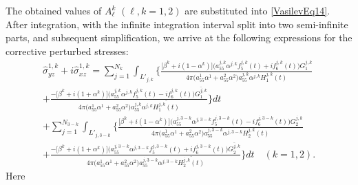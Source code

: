 The obtained values of $A_{\ell}^{k}$ $(\ell,k=1,2)$ are substituted into \eqref{VasilevEq14}. After integration, with the infinite integration interval split into two semi-infinite parts, and subsequent simplification, we arrive at the following expressions for the corrective perturbed stresses:
\begin{multline}
	\widehat{\sigma}_{yz}^{1,k}+i\widehat{\sigma}_{xz}^{1,k}
	=
	\sum_{j=1}^{N_k}\int_{L'_{j,k}}\Bigg\{
	\frac{
		\bigl[\beta^{k}+i(1-\alpha^{k})\bigr]
		\bigl(a_{55}^{j,k}\alpha^{j,k}f_{5}^{j,k}(t)+if_{6}^{j,k}(t)\bigr)
		G_{1}^{j,k}
	}{
		4\pi\bigl(a_{55}^{1}\alpha^{1}+a_{55}^{2}\alpha^{2}\bigr)a_{55}^{j,k}\alpha^{j,k}H_{1}^{j,k}(t)
	}
	\\
	+\frac{
		-\bigl[\beta^{k}+i(1+\alpha^{k})\bigr]
		\bigl(a_{55}^{j,k}\alpha^{j,k}f_{5}^{j,k}(t)-if_{6}^{j,k}(t)\bigr)
		\overline{G_{1}^{j,k}}
	}{
		4\pi\bigl(a_{55}^{1}\alpha^{1}+a_{55}^{2}\alpha^{2}\bigr)a_{55}^{j,k}\alpha^{j,k}\overline{H_{1}^{j,k}(t)}
	}\Bigg\}dt
	\\
	+\sum_{j=1}^{N_{3-k}}\int_{L'_{j,3-k}}\Bigg\{
	\frac{
		\bigl[\beta^{k}+i(1-\alpha^{k})\bigr]
		\bigl(a_{55}^{j,3-k}\alpha^{j,3-k}f_{5}^{j,3-k}(t)-if_{6}^{j,3-k}(t)\bigr)
		G_{2}^{j,k}
	}{
		4\pi\bigl(a_{55}^{1}\alpha^{1}+a_{55}^{2}\alpha^{2}\bigr)a_{55}^{j,3-k}\alpha^{j,3-k}H_{2}^{j,k}(t)
	}
	\\
	+\frac{
		-\bigl[\beta^{k}+i(1+\alpha^{k})\bigr]
		\bigl(a_{55}^{j,3-k}\alpha^{j,3-k}f_{5}^{j,3-k}(t)+if_{6}^{j,3-k}(t)\bigr)
		\overline{G_{2}^{j,k}}
	}{
		4\pi\bigl(a_{55}^{1}\alpha^{1}+a_{55}^{2}\alpha^{2}\bigr)a_{55}^{j,3-k}\alpha^{j,3-k}\overline{H_{2}^{j,k}(t)}
	}\Bigg\}dt
	\quad (k=1,2).
	\label{VasilevEq17}
\end{multline}
%
Here
